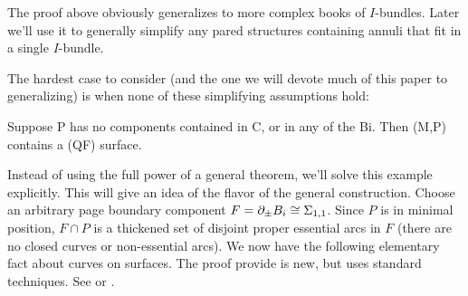 The proof above obviously generalizes to more complex books of $I$-bundles.
Later we'll use it to generally simplify any pared structures containing annuli
that fit in a single $I$-bundle.

The hardest case to consider (and the one we will devote much of this paper to
generalizing) is when none of these simplifying assumptions hold:

\begin{thm}\label{T:ex1}

Suppose P has no components contained in C, or in any of the Bi. Then (M,P)
contains a (QF) surface.

\end{thm}

Instead of using the full power of a general theorem, we'll solve this example
explicitly. This will give an idea of the flavor of the general construction.
Choose an arbitrary page boundary component $F=\partial_\pm B_i \cong \Sigma_{1,1}$.
Since $P$ is in minimal position, $F \cap P$ is a thickened set of disjoint
proper essential arcs in $F$ (there are no closed curves or non-essential
arcs).  We now have the following elementary fact about curves on surfaces.
The proof provide is new, but uses standard techniques. See \cite{FM} or
\cite{FLP}.

